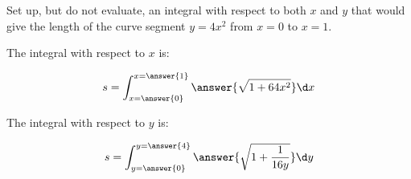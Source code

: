 \documentclass{ximera}
\author{Jim Talamo}
\begin{document}
\begin{exercise}

Set up, but do not evaluate, an integral with respect to both $x$ and $y$ that would give the length of the curve segment $y=4x^2$ from $x=0$ to $x=1$.

The integral with respect to $x$ is:

\[
s= \int_{x=\answer{0}}^{x=\answer{1}} \answer{\sqrt{1+64x^2}} \d x
\]

The integral with respect to $y$ is:

\[
s= \int_{y=\answer{0}}^{y=\answer{4}} \answer{\sqrt{1+\frac{1}{16y}}} \d y
\]
 

\end{exercise}
\end{document}

